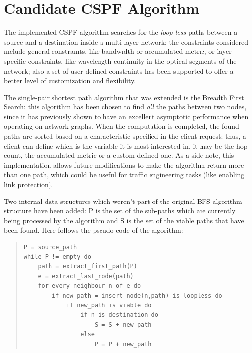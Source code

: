 \documentclass[10pt,a4paper]{report}
\begin{document}
\section{Candidate CSPF Algorithm}

The implemented CSPF algorithm searches for the \textit{loop-less}
paths between a source and a destination inside a multi-layer network;
the constraints considered include general constraints, like bandwidth
or accumulated metric, or layer-specific constraints, like wavelength
continuity in the optical segments of the network; also a set of
user-defined constraints has been supported to offer a better level of
customization and flexibility.

The single-pair shortest path algorithm that was extended is the
Breadth First Search: this algorithm has been chosen to find
\textit{all} the paths between two nodes, since it has previously
shown to have an excellent asymptotic performance when operating on
network graphs.  When the computation is completed, the found paths
are sorted based on a characteristic specified in the client request:
thus, a client can define which is the variable it is most interested
in, it may be the hop count, the accumulated metric or a
custom-defined one. As a side note, this implementation allows future
modifications to make the algorithm return more than one path, which
could be useful for traffic engineering tasks (like enabling link
protection).

Two internal data structures which weren't part of the original BFS
algorithm structure have been added: P is the set of the sub-paths
which are currently being processed by the algorithm and S is the set
of the viable paths that have been found. Here follows the pseudo-code
of the algorithm:

\begin{quote}
\begin{lstlisting}
P = source_path
while P != empty do
    path = extract_first_path(P)
    e = extract_last_node(path)
    for every neighbour n of e do
        if new_path = insert_node(n,path) is loopless do
            if new_path is viable do
                if n is destination do
                    S = S + new_path
                else
                    P = P + new_path
\end{lstlisting}
\end{quote}
\end{document}
